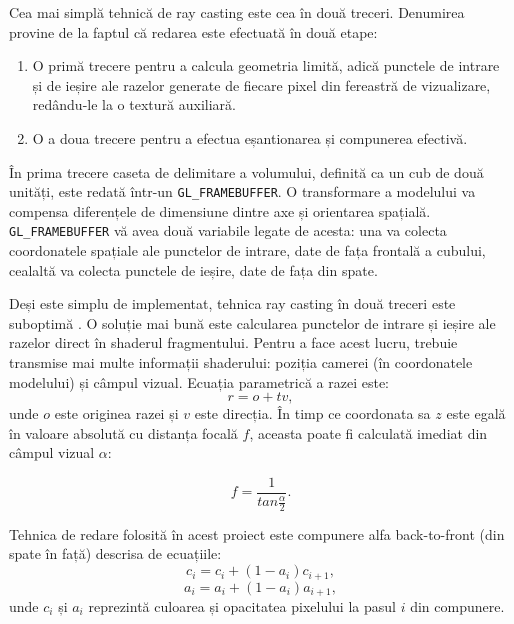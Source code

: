 Cea mai simplă tehnică de ray casting este cea în două treceri. Denumirea provine de la faptul că redarea este efectuată în două etape: 

\begin{enumerate}
    \item O primă trecere pentru a calcula geometria limită, adică punctele de intrare și de ieșire ale razelor generate de fiecare pixel din fereastră de vizualizare, redându-le la o textură auxiliară.
    \item O a doua trecere pentru a efectua eșantionarea și compunerea efectivă.
\end{enumerate}

În prima trecere caseta de delimitare a volumului, definită ca un cub de două unități, este redată într-un
 \verb|GL_FRAMEBUFFER|. O transformare a modelului va compensa diferențele de dimensiune dintre axe și orientarea spațială. \verb|GL_FRAMEBUFFER| vă avea două variabile legate de acesta: una va colecta coordonatele spațiale ale punctelor de intrare, date de fața frontală a cubului, cealaltă va colecta punctele de ieșire, date de fața din spate.

Deși este simplu de implementat, tehnica ray casting în două treceri este suboptimă \cite{10.2312:VG:VG06:039-046}. O soluție mai bună este calcularea punctelor de intrare și ieșire ale razelor direct în shaderul fragmentului. Pentru a face acest lucru, trebuie transmise mai multe informații shaderului: poziția camerei (în coordonatele modelului) și câmpul vizual. Ecuația parametrică a razei este:
\begin{equation}
    r = o + tv,
\end{equation}
unde $o$ este originea razei și $v$ este direcția.
În timp ce coordonata sa $z$ este egală în valoare absolută cu distanța focală $f$, aceasta poate fi calculată imediat din câmpul vizual $\alpha$:

\begin{equation}
    f = \frac{1}{tan \frac{\alpha}{2}}.
\end{equation}

Tehnica de redare folosită în acest proiect este compunere alfa back-to-front (din spate în față) descrisa de ecuațiile:
\begin{equation}
    c_i = c_i + (1 - a_i) c_{i+1},
\end{equation}
\begin{equation}
    a_i = a_i + (1 - a_i) a_{i+1},
\end{equation}
unde $c_i$ și $a_i$ reprezintă culoarea și opacitatea pixelului la pasul $i$ din compunere.

